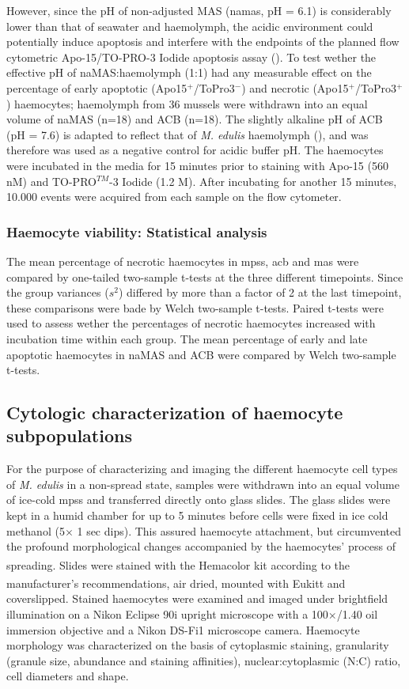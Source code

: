However, since the pH of non-adjusted MAS (\acrshort{namas}, pH = 6.1) is considerably lower than that of seawater and haemolymph, the acidic environment could potentially induce apoptosis and interfere with the endpoints of the planned flow cytometric Apo-15/TO-PRO-3 Iodide apoptosis assay (\cite{Wang2016}). To test wether the effective pH of naMAS:haemolymph (1:1) had any measurable effect on the percentage of early apoptotic (Apo15$^{+}$/ToPro3$^{-}$) and necrotic (Apo15$^{+}$/ToPro3$^{+}$) haemocytes; haemolymph from 36 mussels were withdrawn into an equal volume of naMAS (n=18) and ACB (n=18). The slightly alkaline pH of ACB (pH = 7.6) is adapted to reflect that of \emph{M. edulis} haemolymph (\cite{Pipe1997, Mangan2019}), and was therefore was used as a negative control for acidic buffer pH. The haemocytes were incubated in the media for 15 minutes prior to staining with Apo-15 (560 nM) and TO-PRO$^{TM}$-3 Iodide (1.2 \micro M). After incubating for another 15 minutes, 10.000 events were acquired from each sample on the flow cytometer.

\subsubsection{Haemocyte viability: Statistical analysis}
The mean percentage of necrotic haemocytes in \acrshort{mpss}, \acrshort{acb} and \acrshort{mas} were compared by one-tailed two-sample t-tests at the three different timepoints. Since the group variances ($s^{2}$) differed by more than a factor of 2 at the last timepoint, these comparisons were bade by Welch two-sample t-tests. Paired t-tests were used to assess wether the percentages of necrotic haemocytes increased with incubation time within each group. The mean percentage of early and late apoptotic haemocytes in naMAS and ACB were compared by Welch two-sample t-tests.

\subsection{Cytologic characterization of haemocyte subpopulations}
\label{subsection:morph}
For the purpose of characterizing and imaging the different haemocyte cell types of \emph{M. edulis} in a non-spread state, samples were withdrawn into an equal volume of ice-cold \acrshort{mpss} and transferred directly onto glass slides. The glass slides were kept in a humid chamber for up to 5 minutes before cells were fixed in ice cold methanol (5$\times$ 1 sec dips). This assured haemocyte attachment, but circumvented the profound morphological changes accompanied by the haemocytes’ process of spreading. Slides were stained with the Hemacolor\textsuperscript{\textregistered} kit according to the manufacturer’s recommendations, air dried, mounted with Eukitt\textsuperscript{\textregistered} and coverslipped. Stained haemocytes were examined and imaged under brightfield illumination on a Nikon Eclipse 90i upright microscope with a 100$\times$/1.40 oil immersion objective and a Nikon DS-Fi1 microscope camera. Haemocyte morphology was characterized on the basis of cytoplasmic staining, granularity (granule size, abundance and staining affinities), nuclear:cytoplasmic (N:C) ratio, cell diameters and shape. 


